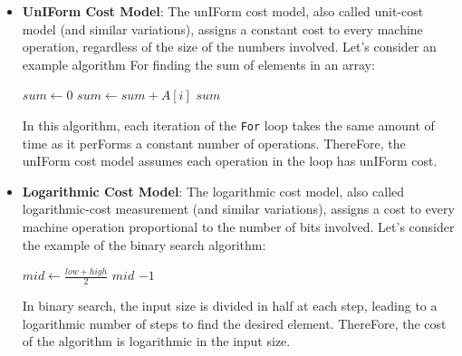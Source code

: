 \documentclass[12pt]{book} %
\begin{document}
\begin{itemize}
    \item 
    \textbf{UnIForm Cost Model}:
    The unIForm cost model, also called unit-cost model (and similar variations), assigns a constant cost to every machine operation, regardless of the size of the numbers involved. 
    \newline
    Let's consider an example algorithm For finding the sum of elements in an array: 

    \begin{algorithm}[H]
    \caption{Sum of Array Elements}
    \begin{algorithmic}[1]
        \State $sum \gets 0$
            \State $sum \gets sum + A[i]$
        \EndFor
        \State \Return $sum$
    \EndFunction
    \end{algorithmic}
    \end{algorithm}

    In this algorithm, each iteration of the \texttt{For} loop takes the same amount of time as it perForms a constant number of operations. ThereFore, the unIForm cost model assumes each operation in the loop has unIForm cost.

    \item 
    \textbf{Logarithmic Cost Model}:
    The logarithmic cost model, also called logarithmic-cost measurement (and similar variations), assigns a cost to every machine operation proportional to the number of bits involved. 
    \newline
    Let's consider the example of the binary search algorithm:

    \begin{algorithm}[H]
    \caption{Binary Search}
    \begin{algorithmic}[1]
            \State $mid \gets \frac{low + high}{2}$
                \State \Return $mid$
                \State \Return {}
            \Else
                \State \Return {}
            \EndIf
        \EndIf
        \State \Return $-1$
    \EndFunction
    \end{algorithmic}
    \end{algorithm}

    In binary search, the input size is divided in half at each step, leading to a logarithmic number of steps to find the desired element. ThereFore, the cost of the algorithm is logarithmic in the input size.
\end{itemize}
\end{document}
